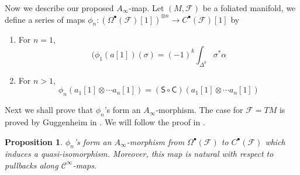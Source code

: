 \documentclass[12pt]{amsart}
\newtheorem{prop}[thm]{Proposition}
\theoremstyle{definition}
\theoremstyle{remark}
\numberwithin{equation}{section}
\newcommand{\CF}{{\mathcal F}}
\newcommand{\cinf}{{\mathcal C}^{\infty}}
\newcommand{\1}{{\mathbb{1}}}
\newcommand{\bt}{\bullet}
\begin{document}
Now we describe our proposed $A_{\infty}$-map. Let $(M, \CF)$ be a foliated manifold, we define a series of maps $\phi_n: (\Omega^{\bt}(\CF)[1])^{\otimes n} \to C^{\bt}(\CF)[1]$ by
\begin{enumerate}
    \item For $n = 1$,
    \begin{equation*}
        (\phi_1(a[1])(\sigma) = (-1)^k \int_{\Delta^k}\sigma^* \alpha
    \end{equation*}
    \item For $n>1$,
    $$\phi_n(a_1[1]\otimes \cdots a_n[1]) = (\mathsf{S}\circ \mathsf{C})(a_1[1]\otimes \cdots a_n[1])
    $$
\end{enumerate}
Next we shall prove that $\phi_n$'s form an $A_{\infty}$-morphism. The case for $\CF = TM$ is proved by Guggenheim in \cite{Gug77}. We will follow the proof in \cite[Theorem 3.25]{AS12}.
\begin{prop}
$\phi_n$'s form an $A_{\infty}$-morphism from $\Omega^{\bt}(\CF)$ to $C^{\bt}(\CF)$ which induces a quasi-isomorphism. Moreover, this map is natural with respect to pullbacks along $\cinf$-maps.
\end{prop}
\end{document}

